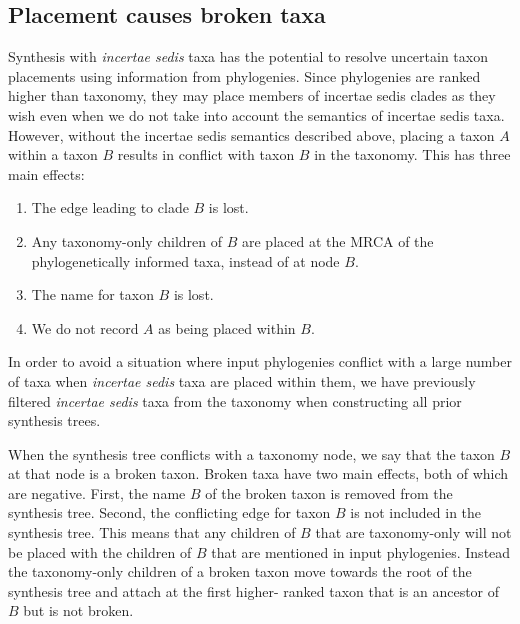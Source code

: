 \documentclass[english]{article}
\begin{document}
\subsection{Placement causes broken taxa}

Synthesis with \emph{incertae sedis} taxa has the potential to resolve
uncertain taxon placements using information from phylogenies.
Since
phylogenies are ranked higher than taxonomy, they may place members of
incertae sedis clades as they wish even when we do not take into
account the semantics of incertae sedis taxa.
However, without the
incertae sedis semantics described above, placing a taxon $A$ within a
taxon $B$ results in conflict with taxon $B$ in the taxonomy.
This has
three main effects: \begin{enumerate}
    \item The edge leading to clade $B$ is lost.
    \item Any taxonomy-only children of $B$ are placed at the
        MRCA of the phylogenetically informed taxa, instead of at node $B$.
    \item The name for taxon $B$ is lost.
    \item We do not record $A$ as being placed within $B$.
\end{enumerate} In order to avoid a situation
where input phylogenies conflict with a large number of taxa when
\emph{incertae sedis} taxa are placed within them, we have previously
filtered \emph{incertae sedis} taxa from the taxonomy when
constructing all prior synthesis trees.

When the synthesis tree conflicts with a taxonomy node, we say that
the taxon $B$ at that node is a broken taxon.
Broken taxa have two
main effects, both of which are negative.
First, the name $B$ of the
broken taxon is removed from the synthesis tree.
Second, the
conflicting edge for taxon $B$ is not included in the synthesis tree.
This means that any children of $B$ that are taxonomy-only will not be
placed with the children of $B$ that are mentioned in input
phylogenies.
Instead the taxonomy-only children of a broken taxon move
towards the root of the synthesis tree and attach at the first higher-
ranked taxon that is an ancestor of $B$ but is not broken.
\end{document}
